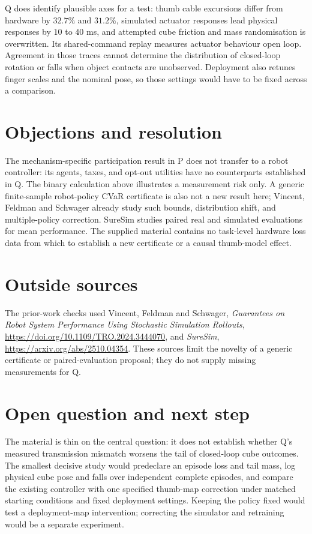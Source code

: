 \documentclass{article}
\begin{document}
Q does identify plausible axes for a test: thumb cable excursions differ from hardware by \(32.7\%\) and \(31.2\%\), simulated actuator responses lead physical responses by \(10\) to \(40\) ms, and attempted cube friction and mass randomisation is overwritten. Its shared-command replay measures actuator behaviour open loop. Agreement in those traces cannot determine the distribution of closed-loop rotation or falls when object contacts are unobserved. Deployment also retunes finger scales and the nominal pose, so those settings would have to be fixed across a comparison. 

\section*{Objections and resolution}

The mechanism-specific participation result in P does not transfer to a robot controller: its agents, taxes, and opt-out utilities have no counterparts established in Q. The binary calculation above illustrates a measurement risk only. A generic finite-sample robot-policy CVaR certificate is also not a new result here; Vincent, Feldman and Schwager already study such bounds, distribution shift, and multiple-policy correction. SureSim studies paired real and simulated evaluations for mean performance. The supplied material contains no task-level hardware loss data from which to establish a new certificate or a causal thumb-model effect. 

\section*{Outside sources}

The prior-work checks used Vincent, Feldman and Schwager, \emph{Guarantees on Robot System Performance Using Stochastic Simulation Rollouts}, \url{https://doi.org/10.1109/TRO.2024.3444070}, and \emph{SureSim}, \url{https://arxiv.org/abs/2510.04354}. These sources limit the novelty of a generic certificate or paired-evaluation proposal; they do not supply missing measurements for Q. 

\section*{Open question and next step}

The material is thin on the central question: it does not establish whether Q's measured transmission mismatch worsens the tail of closed-loop cube outcomes. The smallest decisive study would predeclare an episode loss and tail mass, log physical cube pose and falls over independent complete episodes, and compare the existing controller with one specified thumb-map correction under matched starting conditions and fixed deployment settings. Keeping the policy fixed would test a deployment-map intervention; correcting the simulator and retraining would be a separate experiment. 
\end{document}
